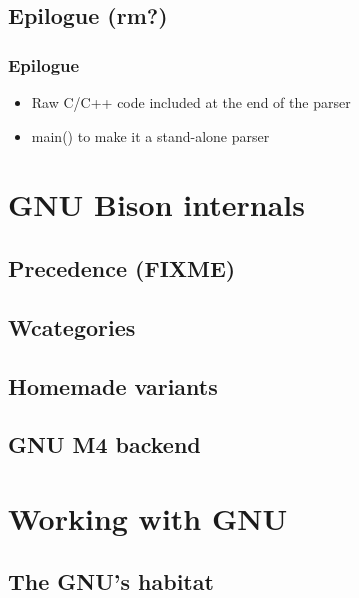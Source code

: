 \documentclass{beamer}
\begin{document}
\subsection{Epilogue (rm?)}

\begin{frame}
  \frametitle{Epilogue}
    \begin{itemize}
      \item Raw C/C++ code included at the end of the parser
      \item main() to make it a stand-alone parser
    \end{itemize}
\end{frame}

\section{GNU Bison internals}

\subsection{Precedence (FIXME)}
\subsection{Wcategories}
\subsection{Homemade variants}
\subsection{GNU M4 backend}

\begin{frame}
\end{frame}

\section{Working with GNU}

\subsection{The GNU's habitat}
\end{document}
